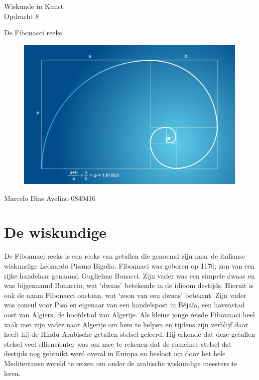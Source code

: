 \documentclass{article}
\begin{document}
\begin{center}
	\huge{Wiskunde in Kunst}\\
	\LARGE{Opdracht }8 \\
	
	\vspace{2cm}
	
	\Large{De Fibonacci reeks}\\
	
	\vfill
	
	\begin{figure}[Hh]
		\centering
		\includegraphics[width=\textwidth]{golden-ratio.jpg}
	\end{figure}
	
	\vfill
	\Large{Marcelo Dias Avelino} \hfill \large{0840416}
\end{center}

\pagebreak

\section{De wiskundige}

De Fibonnaci reeks is een reeks van getallen die genoemd zijn naar de italianse wiskundige Leonardo Pisano Bigollo. Fibonnaci was geboren op 1170, zon van een rijke handelaar genaamd Guglielmo Bonacci. Zijn vader was een simpele dwaas en was bijgenaamd Bonaccio, wat `dwaas' betekende in de idioom destijds. Hieruit is ook de naam Fibonacci onstaan, wat `zoon van een dwaas' betekent. Zijn vader was consul voor Pisa en eigenaar van een handelspost in B\'eja\"ia, een havenstad oost van Algiers, de hoofdstad van Algerije. Als kleine jonge reisde Fibonnaci heel vaak met zijn vader naar Algerije om hem te helpen en tijdens zijn verblijf daar heeft hij de Hindu-Arabische getallen stelsel geleerd. Hij erkende dat deze getallen stelsel veel effienc\"ienter was om mee te rekenen dat de romeinse stelsel dat destijds nog gebruikt werd overal in Europa en besloot om door het hele Mediterranse wereld te reizen om onder de arabische wiskundige meesters te leren.
\end{document}
